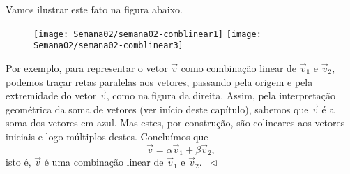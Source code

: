 \begin{ex}
	Vamos ilustrar este fato na figura abaixo.
	\begin{figure}[h!]
		\begin{center}
			\texttt{[image: Semana02/semana02-comblinear1]}
			\texttt{[image: Semana02/semana02-comblinear3]}
		\end{center}
	\end{figure}
	Por exemplo, para representar o vetor $\vec{v}$ como combinação linear de $\vec{v}_1$ e $\vec{v}_2$, podemos traçar retas paralelas aos vetores, passando pela origem e pela extremidade do vetor $\vec{v}$, como na figura da direita. Assim, pela interpretação geométrica da soma de vetores (ver início deste capítulo), sabemos que $\vec{v}$ é a soma dos vetores em azul. Mas estes, por construção, são colineares aos vetores iniciais e logo múltiplos destes. Concluímos que
	\begin{equation}
	\vec{v} = \alpha \vec{v}_1 + \beta \vec{v}_2,
	\end{equation} isto é, $\vec{v}$ é uma combinação linear de $\vec{v}_1$ e $\vec{v}_2$. $\ \lhd$
\end{ex}



